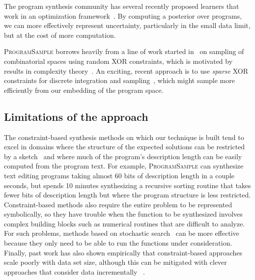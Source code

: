 \documentclass{article}
\newcommand{\theSystem}{\textsc{ProgramSample}}
\begin{document}
The program synthesis community has several recently proposed learners that work in an optimization framework~\cite{raychev2016learning,ellis2015unsupervised,singh2013automated}.%
By computing a posterior over programs, we can more effectively represent uncertainty, particularly in the small data limit, but at the cost of more computation.%


\theSystem{} borrows heavily from a line of work started
in~\cite{gomes2006near,gomes2006model} on sampling of combinatorial
spaces using random XOR constraints, which is motivated by results in
complexity theory~\cite{valiant1985np}.  An exciting, recent approach
is to use \emph{sparse} XOR constraints for discrete integration and
sampling~\cite{ermon2014low,achlioptas2015stochastic}, which might  sample more efficiently from our embedding of the program
space.

\subsection{Limitations of the approach}

The constraint-based synthesis methods on which our technique is built tend to excel in domains where the structure of the expected solutions can be restricted by a sketch~\cite{solar2008program} and where much of the program's description length can be easily computed from the program text. 
For example, \theSystem{} can synthesize text editing programs taking almost 60 bits of description length in a couple seconds, but spends 10 minutes synthesizing a recursive sorting routine that takes fewer bits of description length but where the program structure is less restricted. 
Constraint-based methods also require the entire problem to be represented symbolically, so they have trouble when the function to be synthesized involves complex building blocks such as numerical routines that are difficult to analyze.
For such problems, methods based on stochastic search~\cite{nori2015efficient,schkufza2013stochastic,DBLP:books/daglib/0070933} can be more effective because they only need to be able to run the functions under consideration. Finally, past work has also shown empirically that constraint-based approaches scale poorly with data set size, although this can be mitigated with clever approaches that consider data incrementally ~\cite{ellis2015unsupervised,raychev2016learning}.
\end{document}
